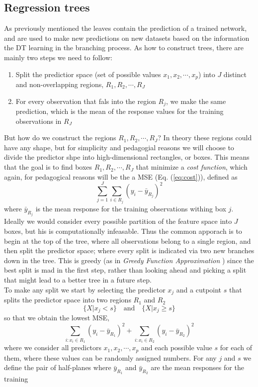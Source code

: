 \documentclass[12pt, a4paper]{book}
\begin{document}
\subsection{Regression trees}
As previously mentioned the leaves contain the prediction of a trained network, and are used to make new predictions on new datasets based on the information the DT learning in the branching process. As how to construct trees, there are mainly two steps we need to follow:
\begin{enumerate}
    \item Split the predictior space (set of possible values $x_1,x_2,\cdots,x_p$) into $J$ distinct and non-overlapping regions, $R_1,R_2,\cdots,R_J$
    \item For every observation that fals into the region $R_j$, we make the same prediction, which is the mean of the response values for the training observations in $R_J$
\end{enumerate}
But how do we construct the regions $R_1,R_2,\cdots,R_J$? In theory these regions could have any shape, but for simplicity and pedagogial reasons we will choose to divide the predictor shpe into high-dimensional rectangles, or boxes. This means that the goal is to find boxes 
$R_1,R_2,\cdots,R_J$ that minimize a \textit{cost function}, which again, for pedagogical reasons will be the a MSE (Eq. (\ref{eq:cost})), defined as 
$$
\sum_{j=1}^{J}\sum_{i\in R_j}(y_i -\bar{y}_{R_j})^2
$$
where $\bar{y}_{R_j}$ is the mean response for the training observations withing box $j$. Ideally we would consider every possible partition of the feature space into $J$ boxes, but his is computationally infeasable. Thus the common apporach is to begin at the top of the tree, 
where all observations belong to a single region, and then split the predictor space; where every split is indicated via two new branches down in the tree. This is greedy (as in \textit{Greedy Function Approximation} \cite{BDT_Friedman}) since the best split is mad in the first step, 
rather than looking ahead and picking a split that might lead to a better tree in a future step.\\ 
To make any split we start by selecting the predictor $x_j$ and a cutpoint $s$ that splits the predictor space into two regions $R_1$ and $R_2$
$$
\{X\vert x_j < s\} \quad\text{and}\quad \{X\vert x_j \ge s\}
$$
so that we obtain the lowest MSE, 
$$
\sum_{i:x_i\in R_1}(y_i-\bar{y}_{R_1})^2 + \sum_{i:x_i\in R_2}(y_i-\bar{y}_{R_2})^2
$$
where we consider all predictors $x_1,x_2,\cdots,x_p$ and each possible value $s$ for each of them, where these values can be randomly assigned numbers. For any $j$ and $s$ we define the pair of half-planes where $\bar{y}_{R_1}$ and $\bar{y}_{R_2}$ are the mean responses for the training 
\end{document}
